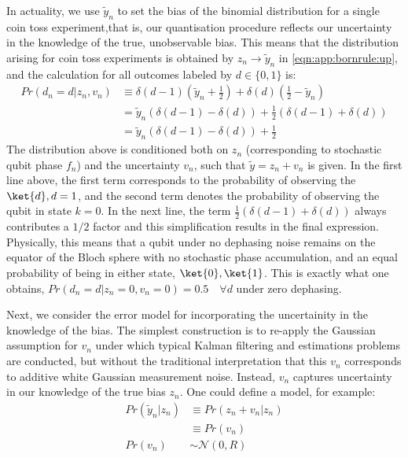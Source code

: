 In actuality, we use $\tilde{y}_n$ to set the bias of the binomial distribution for a single coin toss experiment,that is, our quantisation procedure reflects our uncertainty in the knowledge of the true, unobservable bias. This means that the distribution arising for coin toss experiments is obtained by $z_n \to \tilde{y}_n$ in \cref{eqn:app:bornrule:up}, and the calculation for all outcomes labeled by $ d\in \{0, 1\}$ is:
\begin{align}
Pr(d_n=d | z_n, v_n) &\equiv  \delta(d-1) (\tilde{y}_n + \frac{1}{2})  +  \delta(d) ( \frac{1}{2} - \tilde{y}_n) \\
& =  \tilde{y}_n \left( \delta(d-1) - \delta(d) \right)  + \frac{1}{2}\left(\delta(d-1) + \delta(d) \right) \\
& = \tilde{y}_n \left( \delta(d-1) - \delta(d) \right)  + \frac{1}{2}
\end{align}
The distribution above is conditioned both on $z_n$ (corresponding to stochastic qubit phase $f_n$) and the uncertainty $v_n$, such that $\tilde{y} = z_n + v_n$ is given.  In the first line above, the first term corresponds to the probability of observing the $\ket{d}, d=1$, and the second term denotes the probability of observing the qubit in state $k=0$. In the next line, the term $\frac{1}{2}\left(\delta(d-1) + \delta(d) \right)$ always contributes a $1/2$ factor and this simplification results in the final expression. Physically, this means that a qubit under no dephasing noise remains on the equator of the Bloch sphere with no stochastic phase accumulation, and an equal probability of being in either state, $\ket{0}, \ket{1}$. This is exactly what one obtains, $Pr(d_n=d | z_n=0, v_n=0) = 0.5 \quad \forall d$ under zero dephasing. 

Next, we consider the error model for incorporating the uncertainity in the knowledge of the bias. The simplest construction is to re-apply the Gaussian assumption for $v_n$ under which typical Kalman filtering and estimations problems are conducted, but without the traditional interpretation that this $v_n$ corresponds to additive white Gaussian measurement noise. Instead, $v_n$ captures uncertainty in our knowledge of the true bias $z_n$. One could define a model, for example:
\begin{align}
Pr( \tilde{y}_n | z_n) & \equiv Pr( z_n + v_n | z_n) \\
& \equiv Pr(v_n) \\
Pr(v_n)  & \sim \mathcal{N}(0, R)
\end{align}

